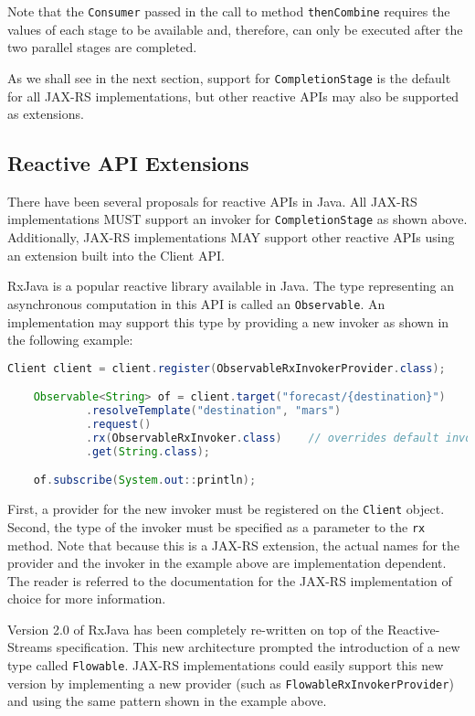 Note that the \lstinline{Consumer} passed in the call to method \lstinline{thenCombine} requires the values of each
stage to be available and, therefore, can only be executed after the two parallel stages are completed.

As we shall see in the next section, support for \lstinline{CompletionStage} is the default for all JAX-RS
implementations, but other reactive APIs may also be supported as extensions.

\subsection{Reactive API Extensions}
\label{reactive_api_extensions}

There have been several proposals for reactive APIs in Java. All JAX-RS implementations MUST support an invoker for
\lstinline{CompletionStage} as shown above. Additionally, JAX-RS implementations MAY support other reactive APIs using
an extension built into the Client API.

RxJava is a popular reactive library available in Java. The type representing an asynchronous computation in this API
is called an \lstinline{Observable}. An implementation may support this type by providing a new invoker as shown in the following example:

\begin{lstlisting}[language=Java]
    Client client = client.register(ObservableRxInvokerProvider.class);

    Observable<String> of = client.target("forecast/{destination}")
            .resolveTemplate("destination", "mars")
            .request()
            .rx(ObservableRxInvoker.class)    // overrides default invoker
            .get(String.class);

    of.subscribe(System.out::println);
\end{lstlisting}

First, a provider for the new invoker must be registered on the \lstinline{Client} object. Second, the type of the
invoker must be specified as a parameter to the \lstinline{rx} method. Note that because this is a JAX-RS extension,
the actual names for the provider and the invoker in the example above are implementation dependent. The reader is
referred to the documentation for the JAX-RS implementation of choice for more information.

Version 2.0 of RxJava has been completely re-written on top of the Reactive-Streams specification. This new architecture
prompted the introduction of a new type called \lstinline{Flowable}. JAX-RS implementations could easily support this
new version by implementing a new provider (such as \lstinline{FlowableRxInvokerProvider}) and using the same pattern
shown in the example above.

